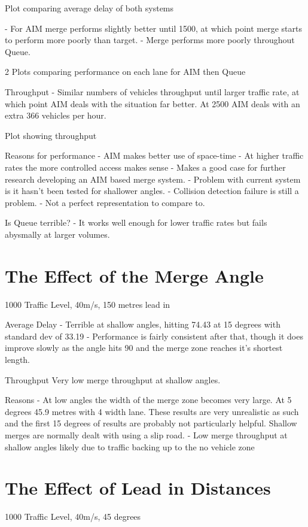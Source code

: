 Plot comparing average delay of both systems

- For AIM merge performs slightly better until 1500, at which point merge starts to perform more poorly than target. 
- Merge performs more poorly throughout Queue. 

2 Plots comparing performance on each lane for AIM then Queue

Throughput
- Similar numbers of vehicles throughput until larger traffic rate, at which point AIM deals with the situation far better. At  2500 AIM deals with an extra 366 vehicles per hour.

Plot showing throughput

Reasons for performance
- AIM makes better use of space-time
- At higher traffic rates the more controlled access makes sense
- Makes a good case for further research developing an AIM based merge system.
	- Problem with current system is it hasn't been tested for shallower angles.
	- Collision detection failure is still a problem. 
	- Not a perfect representation to compare to. 

Is Queue terrible?
- It works well enough for lower traffic rates but fails abysmally at larger volumes.

\section{The Effect of the Merge Angle}
\label{sec:The Effect of the Merge Angle}
1000 Traffic Level, 40m/s, 150 metres lead in

Average Delay
- Terrible at shallow angles, hitting 74.43 at 15 degrees with standard dev of 33.19
- Performance is fairly consistent after that, though it does improve slowly as the angle hits 90 and the merge zone reaches it's shortest length.

Throughput
Very low merge throughput at shallow angles. 

Reasons
- At low angles the width of the merge zone becomes very large. At 5 degrees 45.9 metres with 4 width lane. These results are very unrealistic as such and the first 15 degrees of results are probably not particularly helpful. Shallow merges are normally dealt with using a slip road.
- Low merge throughput at shallow angles likely due to traffic backing up to the no vehicle zone 

\section{The Effect of Lead in Distances}
\label{sec:The Effect of Lead in Distances}
1000 Traffic Level, 40m/s, 45 degrees

